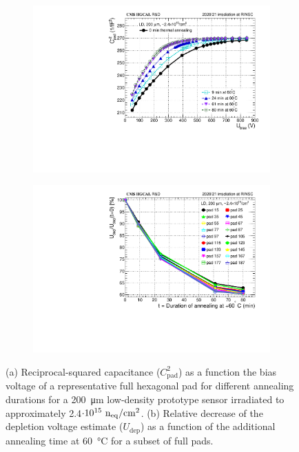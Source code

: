 \begin{figure}
	\captionsetup[subfigure]{aboveskip=-1pt,belowskip=-1pt}
	\centering

	\begin{subfigure}[b]{0.49\textwidth}
		\includegraphics[width=0.999\textwidth]{plots/annealing_Vdep/annealing_CV_ch24.pdf}
		\subcaption{
		}
        \label{plot:annealing_CV}
	\end{subfigure}
    \hfill
    \begin{subfigure}[b]{0.49\textwidth}
		\includegraphics[width=0.999\textwidth]{plots/annealing_Vdep/annealing_Vdep.pdf}
		\subcaption{
		}		
        \label{plot:annealing_Vdep}
	\end{subfigure}
	\caption{
        (a) Reciprocal-squared capacitance ($C^2_\text{pad}$) as a function the bias voltage of a representative full hexagonal pad for different annealing durations for a \SI{200}{\micro\metre} low-density prototype sensor irradiated to approximately 2.4$\cdot 10^{15}~\mathrm{n_{eq}}/\mathrm{cm}^{2}$.   
		(b) Relative decrease of the depletion voltage estimate ($U_\text{dep}$) as a function of the additional annealing time at \SI{60}{\celsius} for a subset of full pads.
	}
\end{figure}

